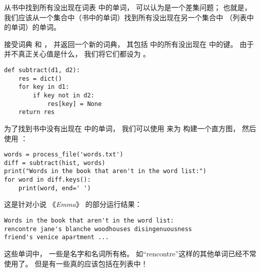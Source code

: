 从书中找到所有没出现在词表  中的单词， 可以认为是一个差集问题；
也就是， 我们应该从一个集合中（书中的单词）找到所有没出现在另一个集合中
（列表中的单词）的单词。  


 接受词典  和  ， 并返回一个新的词典， 
其包括  中的所有没出现在  中的键。  
由于并不真正关心值是什么， 我们将它们都设为 。  

\begin{lstlisting}
def subtract(d1, d2):
    res = dict()
    for key in d1:
        if key not in d2:
            res[key] = None
    return res
\end{lstlisting}


为了找到书中没有出现在  中的单词， 
我们可以使用  来为  构建一个直方图， 
然后使用  ：

\begin{lstlisting}
words = process_file('words.txt')
diff = subtract(hist, words)
print("Words in the book that aren't in the word list:")
for word in diff.keys():
    print(word, end=' ')
\end{lstlisting}


这是针对小说 《{\em Emma}》 的部分运行结果：

\begin{lstlisting}
Words in the book that aren't in the word list:
rencontre jane's blanche woodhouses disingenuousness
friend's venice apartment ...
\end{lstlisting}


这些单词中， 一些是名字和名词所有格。  如“rencontre”这样的其他单词已经不常使用了。  
但是有一些真的应该包括在列表中！

